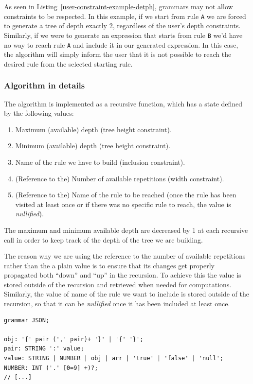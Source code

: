 \documentclass[]{usiinfbachelorproject}
\begin{document}
As seen in Listing~\ref{user-constraint-example-detph}, grammars may not allow
constraints to be respected. In this example, if we start from rule \texttt{A}
we are forced to generate a tree of depth exactly 2, regardless of the user's
depth constraints.
Similarly, if we were to generate an expression that starts from rule
\texttt{B} we'd have no way to reach rule \texttt{A} and include it in our
generated expression. In this case, the algorithm will simply inform the user
that it is not possible to reach the desired rule from the selected starting
rule.

\subsubsection*{\textbf{Algorithm in details}}

The algorithm is implemented as a recursive function, which has a state defined
by the following values:

\begin{enumerate}
\item Maximum (available) depth (tree height constraint).
\item Minimum (available) depth (tree height constraint).
\item Name of the rule we have to build (inclusion constraint).
\item (Reference to the) Number of available repetitions (width constraint).
\item (Reference to the) Name of the rule to be reached (once the rule has been
      visited at least once or if there was no specific rule to reach, the
      value is \textit{nullified}).
\end{enumerate}

The maximum and minimum available depth are decreased by 1 at each recursive
call in order to keep track of the depth of the tree we are building.

The reason why we are using the reference to the number of available repetitions
rather than the a plain value is to ensure that its changes get properly
propagated both ``down'' and ``up'' in the recursion. To achieve this the value
is stored outside of the recursion and retrieved when needed for computations.
Similarly, the value of name of the rule we want to include is stored outside of
the recursion, so that it can be \textit{nullified} once it has been included
at least once.

\begin{lstlisting}[caption={Subset of the JSON grammar},
                   label={impl-expr-algo-reference}
                   style=antlr]
grammar JSON;

obj: '{' pair (',' pair)+ '}' | '{' '}';
pair: STRING ':' value;
value: STRING | NUMBER | obj | arr | 'true' | 'false' | 'null';
NUMBER: INT ('.' [0=9] +)?;
// [...]
\end{lstlisting}
\end{document}
